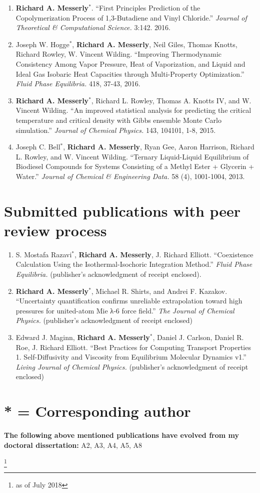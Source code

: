 \documentclass[12pt]{article}
\newcommand\blfootnote[1]{%
	\begingroup
	\renewcommand\thefootnote{}\footnote{#1}%
	\addtocounter{footnote}{-1}%
	\endgroup
}
\begin{document}
\begin{enumerate}
\item \textbf{Richard A. Messerly}$^*$. ``First Principles Prediction of the Copolymerization Process of 1,3-Butadiene and Vinyl Chloride.'' \textit{Journal of Theoretical \& Computational Science.} 3:142. 2016.

\item Joseph W. Hogge$^*$, \textbf{Richard A. Messerly}, Neil Giles, Thomas Knotts, Richard Rowley, W. Vincent Wilding. ``Improving Thermodynamic Consistency Among Vapor Pressure, Heat of Vaporization, and Liquid and Ideal Gas Isobaric Heat Capacities through Multi{-}Property Optimization.'' \textit{Fluid Phase Equilibria.} 418, 37-43, 2016.

\item \textbf{Richard A. Messerly}$^*$, Richard L. Rowley, Thomas A. Knotts IV, and W. Vincent Wilding. ``An improved statistical analysis for predicting the critical temperature and critical density with Gibbs ensemble Monte Carlo simulation.'' \textit{Journal of Chemical Physics.} 143, 104101, 1-8, 2015.

\item Joseph C. Bell$^*$, \textbf{Richard A. Messerly}, Ryan Gee, Aaron Harrison, Richard L. Rowley, and W. Vincent Wilding. ``Ternary Liquid{-}Liquid Equilibrium of Biodiesel Compounds for Systems Consisting of a Methyl Ester + Glycerin + Water.'' \textit{Journal of Chemical \& Engineering Data.} 58 (4), 1001-1004, 2013.

\end{enumerate}

\section{Submitted publications with peer review process}

\begin{enumerate}
	
\item S. Mostafa Razavi$^*$, \textbf{Richard A. Messerly}, J. Richard Elliott. ``Coexistence Calculation Using the Isothermal-Isochoric Integration Method.'' \textit{Fluid Phase Equilibria.} (publisher's acknowledgment of receipt enclosed).

\item \textbf{Richard A. Messerly}$^*$, Michael R. Shirts, and Andrei F. Kazakov. ``Uncertainty quantification confirms unreliable extrapolation toward high pressures for united-atom Mie λ-6 force field.'' \textit{The Journal of Chemical Physics.} (publisher's acknowledgment of receipt enclosed)

\item Edward J. Maginn, \textbf{Richard A. Messerly}$^*$, Daniel J. Carlson, Daniel R. Roe, J. Richard Elliott. ``Best Practices for Computing Transport Properties 1. Self-Diffusivity and Viscosity from Equilibrium Molecular Dynamics v1.'' \textit{Living Journal of Chemical Physics.} (publisher's acknowledgment of receipt enclosed)

\end{enumerate}

\section*{* = Corresponding author}

\textbf{The following above mentioned publications have evolved from my doctoral dissertation:} A2, A3, A4, A5, A8

\blfootnote{as of July 2018}
\end{document}
